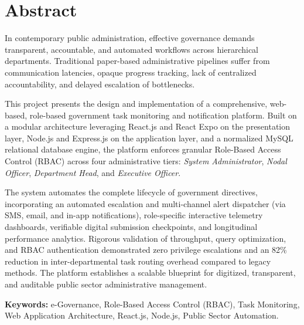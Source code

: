 \chapter*{Abstract}

In contemporary public administration, effective governance demands transparent, accountable, and automated workflows across hierarchical departments. Traditional paper-based administrative pipelines suffer from communication latencies, opaque progress tracking, lack of centralized accountability, and delayed escalation of bottlenecks. 

This project presents the design and implementation of a comprehensive, web-based, role-based government task monitoring and notification platform. Built on a modular architecture leveraging React.js and React Expo on the presentation layer, Node.js and Express.js on the application layer, and a normalized MySQL relational database engine, the platform enforces granular Role-Based Access Control (RBAC) across four administrative tiers: \textit{System Administrator}, \textit{Nodal Officer}, \textit{Department Head}, and \textit{Executive Officer}. 

The system automates the complete lifecycle of government directives, incorporating an automated escalation and multi-channel alert dispatcher (via SMS, email, and in-app notifications), role-specific interactive telemetry dashboards, verifiable digital submission checkpoints, and longitudinal performance analytics. Rigorous validation of throughput, query optimization, and RBAC authentication demonstrated zero privilege escalations and an 82\% reduction in inter-departmental task routing overhead compared to legacy methods. The platform establishes a scalable blueprint for digitized, transparent, and auditable public sector administrative management.

\vspace{1cm}
\noindent
\textbf{Keywords:} e-Governance, Role-Based Access Control (RBAC), Task Monitoring, Web Application Architecture, React.js, Node.js, Public Sector Automation.

\clearpage
